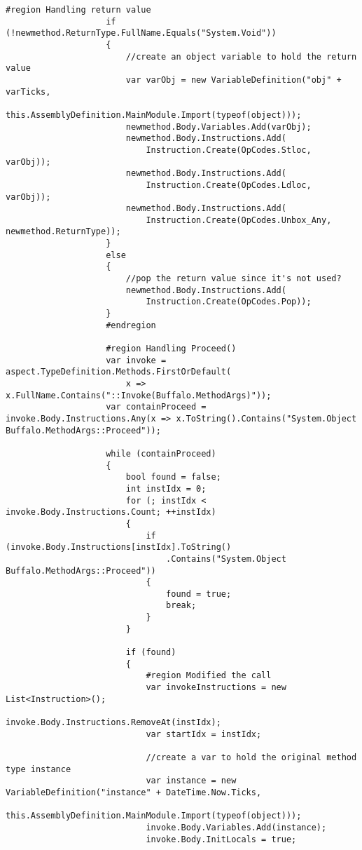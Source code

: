\begin{lstlisting}[caption={../buffalo/Injectors/MethodAroundInjector.cs}, label=../buffalo/Injectors/MethodAroundInjector.cs, frame=tb, basicstyle=\scriptsize]
                    #region Handling return value
                    if (!newmethod.ReturnType.FullName.Equals("System.Void"))
                    {
                        //create an object variable to hold the return value
                        var varObj = new VariableDefinition("obj" + varTicks,
                            this.AssemblyDefinition.MainModule.Import(typeof(object)));
                        newmethod.Body.Variables.Add(varObj);
                        newmethod.Body.Instructions.Add(
                            Instruction.Create(OpCodes.Stloc, varObj));
                        newmethod.Body.Instructions.Add(
                            Instruction.Create(OpCodes.Ldloc, varObj));
                        newmethod.Body.Instructions.Add(
                            Instruction.Create(OpCodes.Unbox_Any, newmethod.ReturnType));
                    }
                    else
                    {
                        //pop the return value since it's not used?
                        newmethod.Body.Instructions.Add(
                            Instruction.Create(OpCodes.Pop));
                    }
                    #endregion

                    #region Handling Proceed()
                    var invoke = aspect.TypeDefinition.Methods.FirstOrDefault(
                        x => x.FullName.Contains("::Invoke(Buffalo.MethodArgs)"));
                    var containProceed = invoke.Body.Instructions.Any(x => x.ToString().Contains("System.Object Buffalo.MethodArgs::Proceed"));

                    while (containProceed)
                    {
                        bool found = false;
                        int instIdx = 0;
                        for (; instIdx < invoke.Body.Instructions.Count; ++instIdx)
                        {
                            if (invoke.Body.Instructions[instIdx].ToString()
                                .Contains("System.Object Buffalo.MethodArgs::Proceed"))
                            {
                                found = true;
                                break;
                            }
                        }

                        if (found)
                        {
                            #region Modified the call
                            var invokeInstructions = new List<Instruction>();
                            invoke.Body.Instructions.RemoveAt(instIdx);
                            var startIdx = instIdx;

                            //create a var to hold the original method type instance
                            var instance = new VariableDefinition("instance" + DateTime.Now.Ticks,
                                this.AssemblyDefinition.MainModule.Import(typeof(object)));
                            invoke.Body.Variables.Add(instance);
                            invoke.Body.InitLocals = true;


\end{lstlisting}
